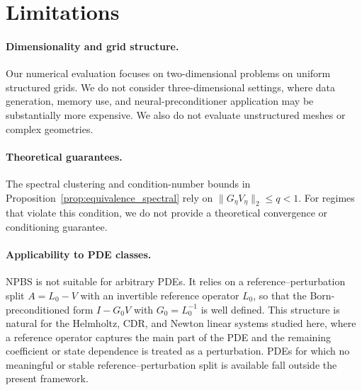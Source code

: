 \documentclass{article}
\theoremstyle{plain}
\theoremstyle{remark}
\begin{document}
\section{Limitations}
\label{app:limitations}

\paragraph{Dimensionality and grid structure.}
Our numerical evaluation focuses on two-dimensional problems on uniform structured grids. We do not consider three-dimensional settings, where data generation, memory use, and neural-preconditioner application may be substantially more expensive. 
We also do not evaluate unstructured meshes or complex geometries.
\paragraph{Theoretical guarantees.}
The spectral clustering and condition-number bounds in Proposition~\ref{prop:equivalence_spectral} rely on $\|G_\eta V_\eta\|_2\le q<1$. For regimes that violate this condition, we do not provide a theoretical convergence or conditioning guarantee.

\paragraph{Applicability to PDE classes.}
NPBS is not suitable for arbitrary PDEs. It relies on a reference--perturbation split $A=L_0-V$ with an invertible reference operator $L_0$, so that the Born-preconditioned form $I-G_0V$ with $G_0=L_0^{-1}$ is well defined. This structure is natural for the Helmholtz, CDR, and Newton linear systems studied here, where a reference operator captures the main part of the PDE and the remaining coefficient or state dependence is treated as a perturbation. PDEs for which no meaningful or stable reference--perturbation split is available fall outside the present framework.

\newpage
% 
\end{document}
